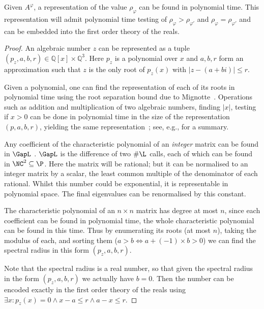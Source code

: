 \documentclass[10pt,a4paper]{amsart}
\numberwithin{equation}{section}
\theoremstyle{plain}
\theoremstyle{definition}
\theoremstyle{remark}
\newcommand{\scc}{\varphi}
\begin{document}
\begin{lem}\label{lem:algebraic}
Given $A^\scc$, a representation of the value $\rho_\scc$ can be found in polynomial time. This representation will admit polynomial time testing of $\rho_\scc > \rho_{\scc'}$ and $\rho_\scc = \rho_{\scc'}$ and can be embedded into the first order theory of the reals.
\end{lem}

\begin{proof}
An algebraic number $z$ can be represented as a tuple $(p_z, a,b,r) \in \mathbb{Q}[x] \times \mathbb{Q}^3$. Here $p_z$ is a polynomial over $x$ and $a,b,r$ form an approximation such that $z$ is the only root of $p_z(x)$ with $|z- (a+bi)| \le r$.

Given a polynomial, one can find the representation of each of its roots in polynomial time using the root separation bound due to Mignotte~\cite{Mig82}. Operations such as addition and multiplication of two algebraic numbers, finding $|x|$, testing if $x > 0$ can be done in polynomial time in the size of the representation $(p,a,b,r)$, yielding the same representation~\cite{basu2005betti,cohen2013course,pan1996optimal}; see, e.g., \cite[Section~3]{ouaknine2014positivity} for a summary.

Any coefficient of the characteristic polynomial of an \textit{integer} matrix can be found in $\GapL$ \cite{hoang2003complexity}. $\GapL$ is the difference of two $\#\L$ calls, each of which can be found in $\NC^2 \subseteq \P$. Here the matrix will be rational; but it can be normalised to an integer matrix by a scalar, the least common multiple of the denominator of each rational. Whilst this number could be exponential, it is representable in polynomial space. The final eigenvalues can be  renormalised by this constant.

The characteristic polynomial of an $n\times n$ matrix has degree at most $n$, since each coefficient can be found in polynomial time, the whole characteristic polynomial can be found in this time. Thus by enumerating its roots (at most $n$), taking the modulus of each, and sorting them ($a > b \iff a + (-1) \times b >0$) we can find the spectral radius in this form $(p_z, a,b,r)$.

Note that the spectral radius is a real number, so that given the spectral radius in the form $(p_z, a,b,r)$ we actually have $b = 0$. Then the number can be encoded exactly in the first order theory of the reals using $\exists x : p_z(x) = 0 \wedge x - a \le r \wedge a - x \le r$.
\end{proof}
\end{document}
